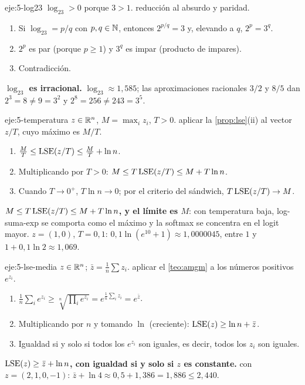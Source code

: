 \begin{solucion}{eje:5-log23}
\datos $\log_23>0$ porque $3>1$.
\planteamiento reducción al absurdo y paridad.
\pasos
\begin{enumerate}[label=\arabic*.]
  \item Si $\log_23=p/q$ con $p,q\in\mathbb{N}$, entonces $2^{p/q}=3$ y, elevando a $q$, $2^p=3^q$.
  \item $2^p$ es par (porque $p\ge1$) y $3^q$ es impar (producto de impares).
  \item Contradicción.
\end{enumerate}
\resultado \textbf{$\log_23$ es irracional.}
\comprobacion $\log_23\approx1{,}585$; las aproximaciones racionales $3/2$ y $8/5$ dan $2^3=8\neq9=3^2$ y $2^8=256\neq243=3^5$.
\end{solucion}

\begin{solucion}{eje:5-temperatura}
\datos $z\in\mathbb{R}^n$, $M=\max_iz_i$, $T>0$.
\planteamiento aplicar la \cref{prop:lse}(ii) al vector $z/T$, cuyo máximo es $M/T$.
\pasos
\begin{enumerate}[label=\arabic*.]
  \item $\frac MT\le\operatorname{LSE}(z/T)\le\frac MT+\ln n$.
  \item Multiplicando por $T>0$: $M\le T\operatorname{LSE}(z/T)\le M+T\ln n$.
  \item Cuando $T\to0^+$, $T\ln n\to0$; por el criterio del sándwich, $T\operatorname{LSE}(z/T)\to M$.
\end{enumerate}
\resultado \textbf{$M\le T\operatorname{LSE}(z/T)\le M+T\ln n$, y el límite es $M$}: con temperatura baja, log-suma-exp se comporta como el máximo y la softmax se concentra en el logit mayor.
\comprobacion $z=(1,0)$, $T=0{,}1$: $0{,}1\ln(e^{10}+1)\approx1{,}0000045$, entre $1$ y $1+0{,}1\ln2\approx1{,}069$.
\end{solucion}

\begin{solucion}{eje:5-lse-media}
\datos $z\in\mathbb{R}^n$; $\bar z=\frac1n\sum z_i$.
\planteamiento aplicar el \cref{teo:amgm} a los números positivos $e^{z_i}$.
\pasos
\begin{enumerate}[label=\arabic*.]
  \item $\frac1n\sum_ie^{z_i}\ge\sqrt[n]{\prod_ie^{z_i}}=e^{\frac1n\sum_iz_i}=e^{\bar z}$.
  \item Multiplicando por $n$ y tomando $\ln$ (creciente): $\operatorname{LSE}(z)\ge\ln n+\bar z$.
  \item Igualdad si y solo si todos los $e^{z_i}$ son iguales, es decir, todos los $z_i$ son iguales.
\end{enumerate}
\resultado \textbf{$\operatorname{LSE}(z)\ge\bar z+\ln n$, con igualdad si y solo si $z$ es constante.}
\comprobacion con $z=(2,1,0,-1)$: $\bar z+\ln4\approx0{,}5+1{,}386=1{,}886\le2{,}440$.
\end{solucion}

